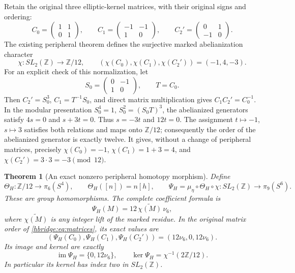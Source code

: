 \documentclass[11pt,letterpaper]{article}
\numberwithin{equation}{section}
\newtheorem{theorem}{Theorem}[section]
\theoremstyle{definition}
\theoremstyle{remark}
\begin{document}
Retain the original three elliptic-kernel matrices, with their
original signs and ordering:
\begin{equation}
C_0=\begin{pmatrix}1&1\\0&1\end{pmatrix},\qquad
C_1=\begin{pmatrix}-1&-1\\1&0\end{pmatrix},\qquad
C_2'=\begin{pmatrix}0&1\\-1&0\end{pmatrix}.
\label{hbridge:eq:matrices}
\end{equation}
The existing peripheral theorem \cite{hbridgebib:HBHigher} defines the
surjective marked abelianization character
\begin{equation}
\chi:SL_2(\mathbb Z)\longrightarrow\mathbb Z/12,
\qquad
(\chi(C_0),\chi(C_1),\chi(C_2'))=(-1,4,-3).
\label{hbridge:eq:chi}
\end{equation}
For an explicit check of this normalization, let
\[
S_0=\begin{pmatrix}0&-1\\1&0\end{pmatrix},\qquad T=C_0.
\]
Then \(C_2'=S_0^3\), \(C_1=T^{-1}S_0\), and direct matrix
multiplication gives \(C_1C_2'=C_0^{-1}\). In the modular
presentation \(S_0^4=1\), \(S_0^2=(S_0T)^3\), the
abelianized generators satisfy \(4s=0\) and \(s+3t=0\).
Thus \(s=-3t\) and \(12t=0\). The assignment
\(t\mapsto-1\), \(s\mapsto3\) satisfies both relations and
maps onto \(\mathbb Z/12\); consequently the order of the
abelianized generator is exactly twelve. It gives, without a
change of peripheral matrices, precisely
\(\chi(C_0)=-1\), \(\chi(C_1)=1+3=4\), and
\(\chi(C_2')=3\cdot3=-3\pmod{12}\).

\begin{theorem}[An exact nonzero peripheral homotopy morphism]
\label{hbridge:peripheral-theorem}
Define
\begin{equation}
\Theta_H:\mathbb Z/12\longrightarrow\pi_6(S^4),
\qquad \Theta_H([n])=n[h],
\qquad
\Psi_H=\mu_\eta\circ\Theta_H\circ\chi:
SL_2(\mathbb Z)\longrightarrow\pi_9(S^6).
\label{hbridge:eq:Psi}
\end{equation}
These are group homomorphisms. The complete coefficient formula is
\begin{equation}
\Psi_H(M)=12\,\widetilde{\chi(M)}\,\nu_6,
\label{hbridge:eq:coefficient}
\end{equation}
where \(\widetilde{\chi(M)}\) is any integer lift of the
marked residue. In the original matrix order of
\eqref{hbridge:eq:matrices}, its exact values are
\begin{equation}
(\Psi_H(C_0),\Psi_H(C_1),\Psi_H(C_2'))
=(12\nu_6,0,12\nu_6).
\label{hbridge:eq:values}
\end{equation}
Its image and kernel are exactly
\begin{equation}
\operatorname{im}\Psi_H=\{0,12\nu_6\},\qquad
\ker\Psi_H=\chi^{-1}(2\mathbb Z/12).
\label{hbridge:eq:kernel}
\end{equation}
In particular its kernel has index two in \(SL_2(\mathbb Z)\).
\end{theorem}
\end{document}
